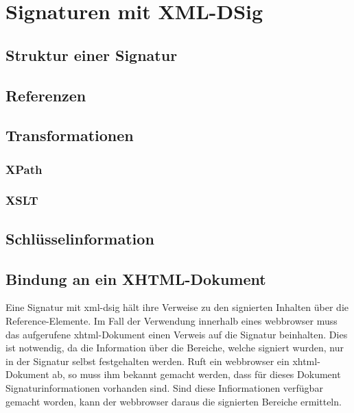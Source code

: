 
\chapter{Signaturen mit XML-DSig}
\label{chp:SignaturenXMLDSig}

\section{Struktur einer Signatur}

\section{Referenzen}
\label{sec:Signaturbindung:Referenzen}

\section{Transformationen}
\label{sec:Signaturbindung:Transformationen}

\subsection{XPath}
\label{sec:Signaturbindung:Transformationen:XPath}

\subsection{XSLT}
\label{sec:Signaturbindung:Transformationen:XSLT}

\section{Schlüsselinformation}

\section{Bindung an ein XHTML-Dokument}
Eine Signatur mit \gls{xml-dsig} hält ihre Verweise zu den signierten Inhalten über die Reference-Elemente. Im Fall der Verwendung innerhalb eines
\gls{webbrowser} muss das aufgerufene \gls{xhtml}-Dokument einen Verweis auf die Signatur beinhalten. Dies ist notwendig, da die Information über die Bereiche,
welche signiert wurden, nur in der Signatur selbst festgehalten werden. Ruft ein \gls{webbrowser} ein \gls{xhtml}-Dokument ab, so muss ihm bekannt gemacht
werden, dass für dieses Dokument Signaturinformationen vorhanden sind. Sind diese Infiormationen verfügbar gemacht worden, kann der \gls{webbrowser} daraus die
signierten Bereiche ermitteln.\\

